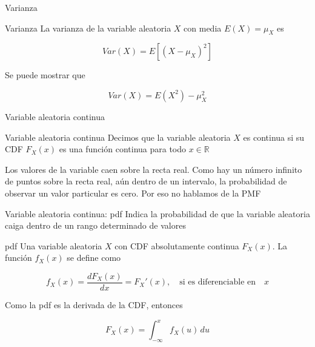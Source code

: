 \documentclass{beamer}
\begin{document}
\begin{frame}{Varianza}

\begin{block}{Varianza}
La varianza de la variable aleatoria $X$ con media $E(X)=\mu_X$ es

\begin{equation*}
    Var(X)=E[(X-\mu_X)^2]
\end{equation*}
    
\end{block}

    Se puede mostrar que

    \begin{equation*}
        Var(X)=E(X^2)-\mu^2_X
    \end{equation*}
\end{frame}

\begin{frame}{Variable aleatoria continua}

\begin{block}{Variable aleatoria continua}
    Decimos que la variable aleatoria $X$ es continua si su CDF $F_X(x)$ es una función continua para todo $x \in \mathbb{R}$
\end{block}

Los valores de la variable caen sobre la recta real. Como hay un número infinito de puntos sobre la recta real, aún dentro de un intervalo, la probabilidad de observar un valor particular es cero. Por eso no hablamos de la PMF
    
\end{frame}

\begin{frame}{Variable aleatoria continua: pdf}
    Indica la probabilidad de que la variable aleatoria caiga dentro de un rango determinado de valores

    \begin{block}{pdf}
    Una variable aleatoria $X$ con CDF absolutamente continua $F_X(x)$. La función $f_X(x)$ se define como

    \begin{equation*}
        f_X(x)=\dfrac{dF_X(x)}{dx}=F_X'(x), \quad \text{si es diferenciable en} \quad x 
    \end{equation*}
        
    \end{block}

    Como la pdf es la derivada de la CDF, entonces

    \begin{equation*}
        F_X(x)=\int_{-\infty}^x f_X(u) \, du
    \end{equation*}
\end{frame}
\end{document}
